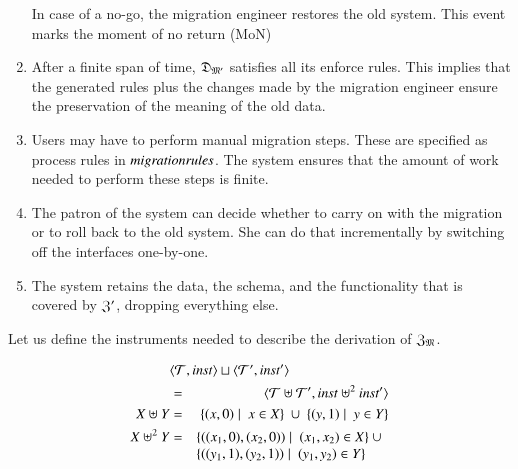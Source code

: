\documentclass{elsarticle}
\begin{document}
\begin{enumerate}
         In case of a no-go, the migration engineer restores the old system.
         This event marks the moment of no return (MoN)
   \item After a finite span of time, $\mathfrak{D}_{\mathfrak{M}'}$ satisfies all its enforce rules.
         This implies that the generated rules plus the changes made by the migration engineer ensure the preservation of the meaning of the old data.
   \item Users may have to perform manual migration steps.
         These are specified as process rules in $\text{\it migrationrules\/}$.
         The system ensures that the amount of work needed to perform these steps is finite.
   \item The patron of the system can decide whether to carry on with the migration or to roll back to the old system.
         She can do that incrementally by switching off the interfaces one-by-one.
   \item The system retains the data, the schema, and the functionality that is covered by $\mathfrak{Z}'$, dropping everything else.
\end{enumerate}

   Let us define the instruments needed to describe the derivation of $\mathfrak{Z}_{\mathfrak{M}}$.
\begin{definition}
\begin{eqnarray}
   \rlap{$\pair{\triples}{\inst}\sqcup\pair{\triples'}{\inst'}$}\notag\\
   &=&\pair{\triples\uplus\triples'}{\inst\uplus^2\inst'}\notag\\
      X\uplus Y&=&\{(x,0)\mid\ x\in X\}\ \cup\ \{(y,1)\mid\ y\in Y\}\\
      X\uplus^2 Y&=&\begin{array}[t]{@{}l}\{((x_1,0),(x_2,0))\mid\ (x_1,x_2)\in X\}\ \cup\\ \{((y_1,1),(y_2,1))\mid\ (y_1,y_2)\in Y\}\end{array}\\
\end{eqnarray}
\end{definition}
\end{document}

